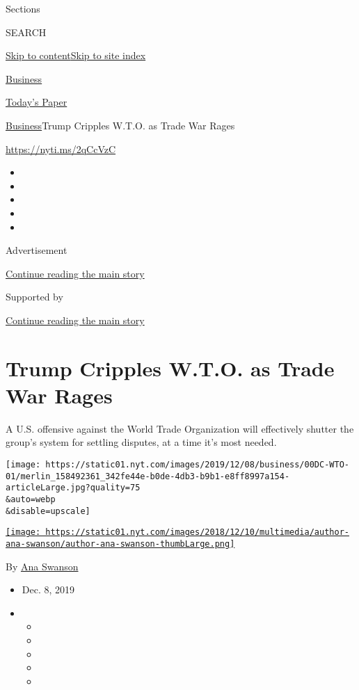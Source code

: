Sections

SEARCH

\protect\hyperlink{site-content}{Skip to
content}\protect\hyperlink{site-index}{Skip to site index}

\href{https://www.nytimes.com/section/business}{Business}

\href{https://myaccount.nytimes.com/auth/login?response_type=cookie\&client_id=vi}{}

\href{https://www.nytimes.com/section/todayspaper}{Today's Paper}

\href{/section/business}{Business}\textbar{}Trump Cripples W.T.O. as
Trade War Rages

\url{https://nyti.ms/2qCcVzC}

\begin{itemize}
\item
\item
\item
\item
\item
\end{itemize}

Advertisement

\protect\hyperlink{after-top}{Continue reading the main story}

Supported by

\protect\hyperlink{after-sponsor}{Continue reading the main story}

\hypertarget{trump-cripples-wto-as-trade-war-rages}{%
\section{Trump Cripples W.T.O. as Trade War
Rages}\label{trump-cripples-wto-as-trade-war-rages}}

A U.S. offensive against the World Trade Organization will effectively
shutter the group's system for settling disputes, at a time it's most
needed.

\texttt{[image: https://static01.nyt.com/images/2019/12/08/business/00DC-WTO-01/merlin\_158492361\_342fe44e-b0de-4db3-b9b1-e8ff8997a154-articleLarge.jpg?quality=75\\\&auto=webp\\\&disable=upscale]}

\href{https://www.nytimes.com/by/ana-swanson}{\texttt{[image: https://static01.nyt.com/images/2018/12/10/multimedia/author-ana-swanson/author-ana-swanson-thumbLarge.png]}}

By \href{https://www.nytimes.com/by/ana-swanson}{Ana Swanson}

\begin{itemize}
\item
  Dec. 8, 2019
\item
  \begin{itemize}
  \item
  \item
  \item
  \item
  \item
  \end{itemize}
\end{itemize}

